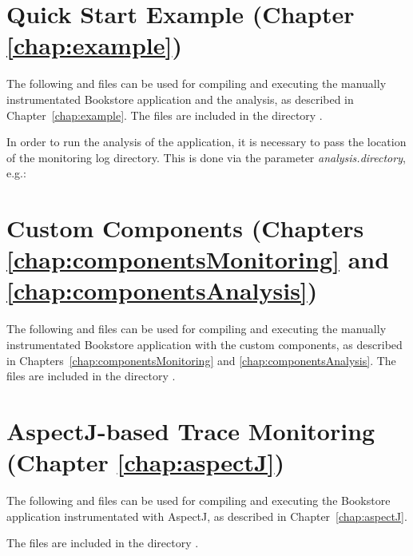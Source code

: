 \section{Quick Start Example (Chapter \ref{chap:example})}
The following  and  files can be %
used for compiling and executing the manually instrumentated Bookstore %
application and the analysis, as described in Chapter~\ref{chap:example}. %
The files are included in the directory \file{\manualInstrumentedBookstoreApplicationDirDistro{}/}.

      In order to run the analysis of the application, it is necessary to pass the location of the monitoring log directory. This is done via the parameter \textit{analysis.directory}, e.g.:
      \setBashListing
      

      \setXMLListing
      
      
\newpage
\section{Custom Components (Chapters \ref{chap:componentsMonitoring} and \ref{chap:componentsAnalysis})}
      The following  and  files can be used for compiling and executing the manually instrumentated Bookstore application with the custom components, as described in Chapters~\ref{chap:componentsMonitoring} and \ref{chap:componentsAnalysis}. %
The files are included in the directory \file{\customComponentsBookstoreApplicationDirDistro{}/}.
      \setXMLListing
      
      
\newpage
\section{AspectJ-based Trace Monitoring (Chapter \ref{chap:aspectJ})}
      The following  and  files can be used for compiling and executing the Bookstore application instrumentated with AspectJ, as described in Chapter~\ref{chap:aspectJ}. %

The files are included in the directory \file{\aspectJBookstoreApplicationDirDistro{}/}.
      \setXMLListing
           
      